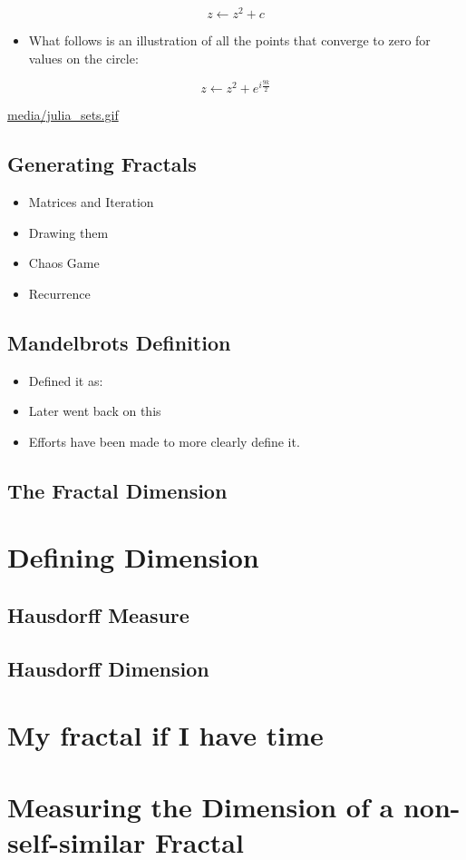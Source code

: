 \documentclass[11pt]{article}
\begin{document}
\[
z \leftarrow z^{2} + c
\]

\begin{itemize}
\item What follows is an illustration of all the points that converge to zero for values on the circle:
\end{itemize}

\[
z \leftarrow z^{2} + e^{i \frac{9k}{2}}
\]

\url{media/julia\_sets.gif}

\subsection{Generating Fractals}
\label{sec:org9e964e2}
\begin{itemize}
\item Matrices and Iteration
\item Drawing them
\item Chaos Game
\item Recurrence
\end{itemize}
\subsection{Mandelbrots Definition}
\label{sec:orgd2a1602}
\begin{itemize}
\item Defined it as:
\item Later went back on this
\item Efforts have been made to more clearly define it.
\end{itemize}
\subsection{The Fractal Dimension}
\label{sec:org4c9cd29}
\section{Defining Dimension}
\label{sec:orgde077ff}
\subsection{Hausdorff Measure}
\label{sec:org28bf5ee}
\subsection{Hausdorff Dimension}
\label{sec:org1f37539}
\section{My fractal if I have time}
\label{sec:org6e94962}
\section{Measuring the Dimension of a non-self-similar Fractal}
\label{sec:org09a3a4e}
\end{document}
